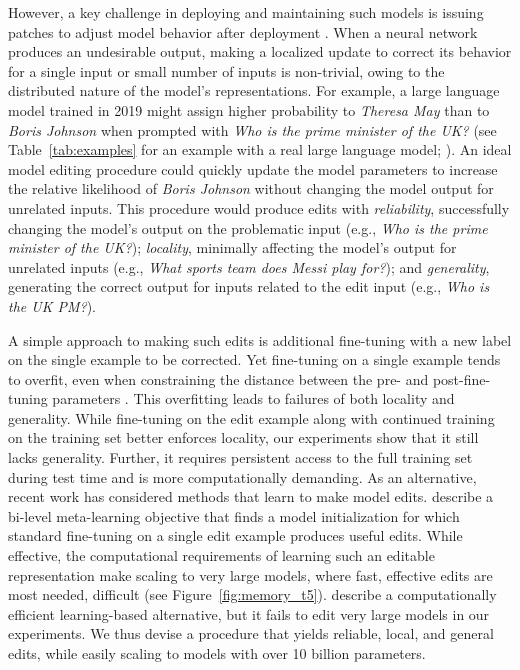 \documentclass{article}
\begin{document}
 However, a key challenge in deploying and maintaining such models is issuing patches to adjust model behavior after deployment \citep{Sinitsin2020Editable}. When a neural network produces an undesirable output, making a localized update to correct its behavior for a single input or small number of inputs is non-trivial, owing to the distributed nature of the model's representations. For example, a large language model trained in 2019 might assign higher probability to \textit{Theresa May} than to \textit{Boris Johnson} when prompted with \textit{Who is the prime minister of the UK?} (see Table~\ref{tab:examples} for an example with a real large language model; ). An ideal model editing procedure could quickly update the model parameters to increase the relative likelihood of \textit{Boris Johnson} without changing the model output for unrelated inputs. This procedure would produce edits with \textit{reliability}, successfully changing the model's output on the problematic input (e.g., \textit{Who is the prime minister of the UK?}); \textit{locality}, minimally affecting the model's output for unrelated inputs (e.g., \textit{What sports team does Messi play for?}); and \textit{generality}, generating the correct output for inputs related to the edit input (e.g., \textit{Who is the UK PM?}).

A simple approach to making such edits is additional fine-tuning with a new label on the single example to be corrected. Yet fine-tuning on a single example tends to overfit, even when constraining the distance between the pre- and post-fine-tuning parameters \citep{zhu2020modifying,Cao2021EditingFK}. This overfitting leads to failures of both locality and generality. While fine-tuning on the edit example along with continued training on the training set better enforces locality, our experiments show that it still lacks generality. Further, it requires persistent access to the full training set during test time and is more computationally demanding. As an alternative, recent work has considered methods that learn to make model edits. \citet{Sinitsin2020Editable} describe a bi-level meta-learning objective that finds a model initialization for which standard fine-tuning on a single edit example produces useful edits. While effective, the computational requirements of learning such an editable representation make scaling to very large models, where fast, effective edits are most needed, difficult (see Figure~\ref{fig:memory_t5}). \citet{Cao2021EditingFK} describe a computationally efficient learning-based alternative, but it fails to edit very large models in our experiments. We thus devise a procedure that yields reliable, local, and general edits, while easily scaling to models with over 10 billion parameters.
\end{document}
